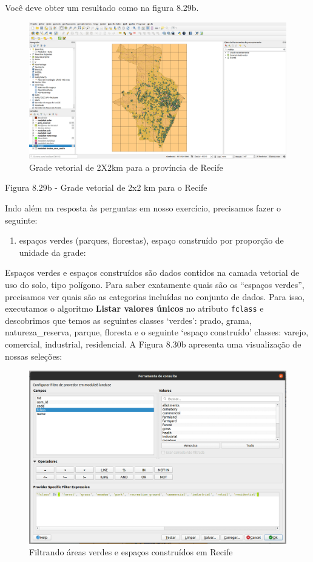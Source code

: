 \documentclass[
]{krantz}
\providecommand{\tightlist}{%
  \setlength{\itemsep}{0pt}\setlength{\parskip}{0pt}}
\begin{document}
Você deve obter um resultado como na figura 8.29b.

\begin{figure}
\centering
\includegraphics{media/modulo8/fig829_b.png}
\caption{Grade vetorial de 2X2km para a província de Recife}
\end{figure}

Figura 8.29b - Grade vetorial de 2x2 km para o Recife

Indo além na resposta às perguntas em nosso exercício, precisamos fazer o seguinte:

\begin{enumerate}
\def\labelenumi{\arabic{enumi}.}
\tightlist
\item
  espaços verdes (parques, florestas), espaço construído por proporção de unidade da grade:
\end{enumerate}

Espaços verdes e espaços construídos são dados contidos na camada vetorial de uso do solo, tipo polígono. Para saber exatamente quais são os ``espaços verdes'', precisamos ver quais são as categorias incluídas no conjunto de dados. Para isso, executamos o algoritmo \textbf{Listar valores únicos} no atributo \texttt{fclass} e descobrimos que temos as seguintes classes `verdes': prado, grama, natureza\_reserva, parque, floresta e o seguinte `espaço construído' classes: varejo, comercial, industrial, residencial. A Figura 8.30b apresenta uma visualização de nossas seleções:

\begin{figure}
\centering
\includegraphics{media/modulo8/fig830_a.png}
\caption{Filtrando áreas verdes e espaços construídos em Recife}
\end{figure}
\end{document}
